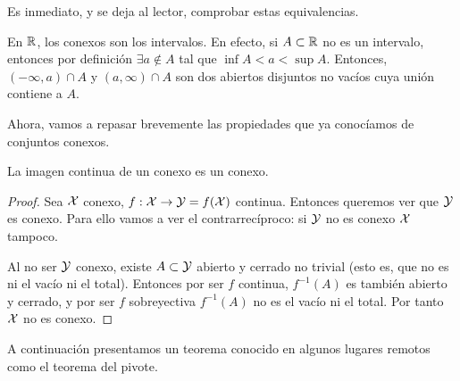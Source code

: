 Es inmediato, y se deja al lector, comprobar estas equivalencias.

\begin{exa}
	En $\mathbb{R}$, los conexos son los intervalos. En efecto, si $A\subset\mathbb{R}$ no es un intervalo, entonces por definición $\exists a\notin A$ tal que $\inf A< a < \sup A$. Entonces, $(-\infty, a)\cap A$ y $(a,\infty)\cap A$ son dos abiertos disjuntos no vacíos cuya unión contiene a $A$.
\end{exa}

Ahora, vamos a repasar brevemente las propiedades que ya conocíamos de conjuntos conexos.

\begin{prop}
	\label{conex_prop_im_continua}
	La imagen continua de un conexo es un conexo.
\end{prop}
\begin{proof}
	Sea $\mathcal{X}$ conexo, $f:\mathcal{X}\to\mathcal{Y}=f(\mathcal{X})$ continua. Entonces queremos ver que $\mathcal{Y}$ es conexo. Para ello vamos a ver el contrarrecíproco: si $\mathcal{Y}$ no es conexo $\mathcal{X}$ tampoco.
	
	Al no ser $\mathcal{Y}$ conexo, existe $A\subset\mathcal{Y}$ abierto y cerrado no trivial (esto es, que no es ni el vacío ni el total). Entonces por ser $f$ continua, $f^{-1}(A)$ es también abierto y cerrado, y por ser $f$ sobreyectiva $f^{-1}(A)$ no es el vacío ni el total. Por tanto $\mathcal{X}$ no es conexo.
\end{proof}


A continuación presentamos un teorema conocido en algunos lugares remotos como el teorema del pivote.


